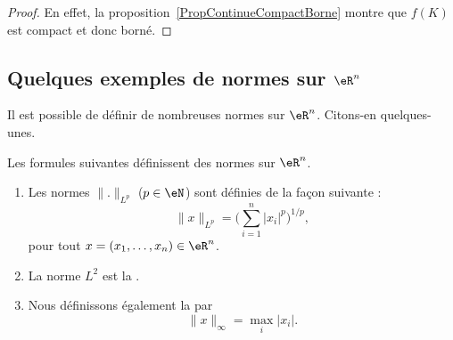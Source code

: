 \begin{proof}
	En effet, la proposition~\ref{PropContinueCompactBorne} montre que $f(K)$ est compact et donc borné.
\end{proof}



\subsection{Quelques exemples de normes sur \texorpdfstring{$\eR^n$}{Rn}}

Il est possible de définir de nombreuses normes sur $\eR^n$. Citons-en quelques-unes.

\begin{propositionDef}      \label{PROPooCLZRooIRxCnZ}
    Les formules suivantes définissent des normes sur \( \eR^n\).
    \begin{enumerate}
        \item
    Les normes $\| . \|_{L^p}$ ($p\in\eN$) sont définies de la façon suivante :
    \begin{equation}		\label{EqDeformeLp}
        \| x \|_{L^p}=\Big( \sum_{i=1}^n| x_i |^p\Big)^{1/p},
    \end{equation}
    pour tout $x=(x_1,\ldots,x_n)\in\eR^n$.
\item
    La norme $L^2$ est la .
\item
    Nous définissons également la  par
    \begin{equation}
	    \| x \|_{\infty}=\max_i| x_i |.
    \end{equation}
    \end{enumerate}
\end{propositionDef}

